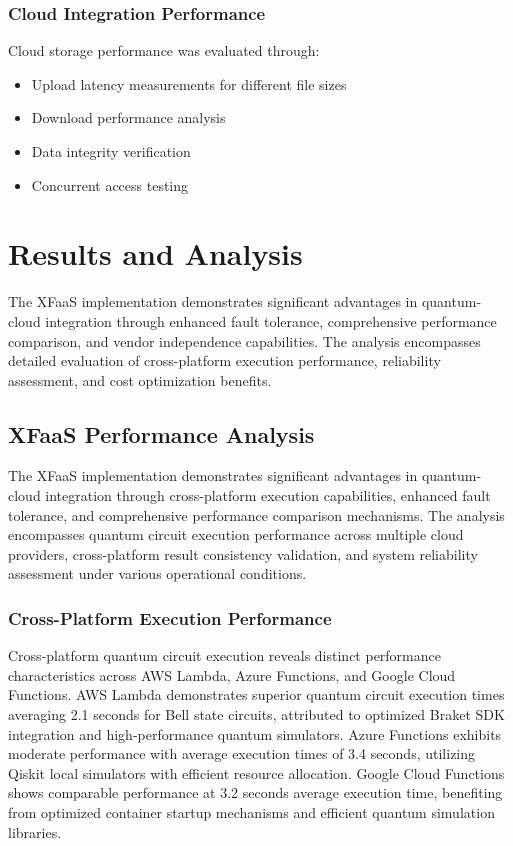 \documentclass[onecolumn]{IEEEtran}
\begin{document}
\subsubsection{Cloud Integration Performance}

Cloud storage performance was evaluated through:
\begin{itemize}
    \item Upload latency measurements for different file sizes
    \item Download performance analysis
    \item Data integrity verification
    \item Concurrent access testing
\end{itemize}

\section{Results and Analysis}

The XFaaS implementation demonstrates significant advantages in quantum-cloud integration through enhanced fault tolerance, comprehensive performance comparison, and vendor independence capabilities. The analysis encompasses detailed evaluation of cross-platform execution performance, reliability assessment, and cost optimization benefits.

\subsection{XFaaS Performance Analysis}

The XFaaS implementation demonstrates significant advantages in quantum-cloud integration through cross-platform execution capabilities, enhanced fault tolerance, and comprehensive performance comparison mechanisms. The analysis encompasses quantum circuit execution performance across multiple cloud providers, cross-platform result consistency validation, and system reliability assessment under various operational conditions.

\subsubsection{Cross-Platform Execution Performance}

Cross-platform quantum circuit execution reveals distinct performance characteristics across AWS Lambda, Azure Functions, and Google Cloud Functions. AWS Lambda demonstrates superior quantum circuit execution times averaging 2.1 seconds for Bell state circuits, attributed to optimized Braket SDK integration and high-performance quantum simulators. Azure Functions exhibits moderate performance with average execution times of 3.4 seconds, utilizing Qiskit local simulators with efficient resource allocation. Google Cloud Functions shows comparable performance at 3.2 seconds average execution time, benefiting from optimized container startup mechanisms and efficient quantum simulation libraries.
\end{document}
